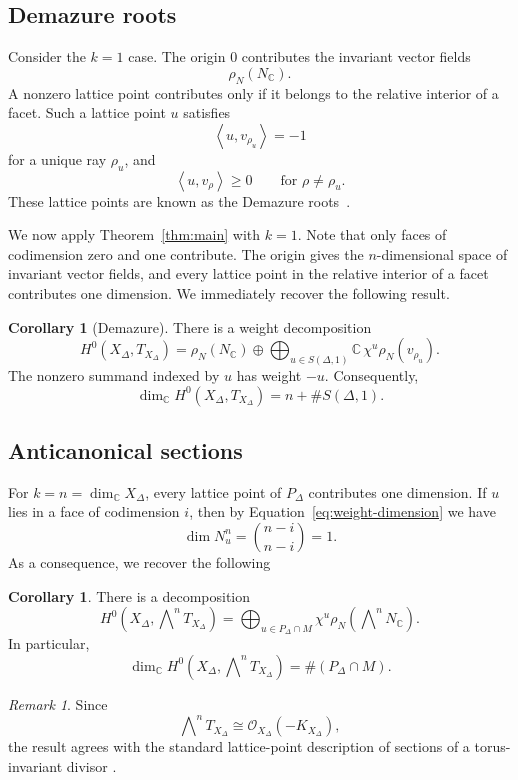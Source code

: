 \documentclass[colorlinks,11pt,reqno]{amsart}
\theoremstyle{definition}
\newtheorem{corollary}[theorem]{Corollary}
\theoremstyle{remark}
\newtheorem{remark}[theorem]{Remark}
\numberwithin{equation}{section}
\numberwithin{equation}{section}
\newcommand{\CC}{\mathbb{C}}
\newcommand{\Pair}[2]{\left\langle #1,#2\right\rangle}
\newcommand{\C}{\mathbb{C}}
\begin{document}
\subsection{Demazure roots}
Consider the \(k=1\) case. The origin $0$ contributes the invariant vector fields
\[
\rho_N(N_{\C}).
\]
A nonzero lattice point contributes only if it belongs to the relative interior of a facet. Such a lattice point \(u\) satisfies
\[
\Pair{u}{v_{\rho_u}}=-1
\]
for a unique ray \(\rho_u\), and
\[
\Pair{u}{v_\rho}\geq 0 \qquad \text{for }\rho\neq\rho_u.
\]
These lattice points are known as the Demazure roots~\cites{Cox, Demazure}.

We now apply Theorem~\ref{thm:main} with \(k=1\).
Note that only faces of codimension zero and one contribute. The origin gives the \(n\)-dimensional space of invariant vector fields, and every lattice point in the relative interior of a facet contributes one dimension.
We immediately recover the following result.
\begin{corollary}[Demazure]\label{cor:demazure}
There is a weight decomposition
\[
H^0(X_\Delta,T_{X_\Delta}) = \rho_N(N_{\CC}) \oplus \bigoplus_{u\in S(\Delta,1)}
\CC\, \chi^u\rho_N(v_{\rho_u}).
\]
The nonzero summand indexed by \(u\) has weight \(-u\).
Consequently,
\[
\dim_{\CC}H^0(X_\Delta,T_{X_\Delta}) = n+\#S(\Delta,1).
\]
\end{corollary}


\subsection{Anticanonical sections}
For \(k=n = \dim_\C X_{\Delta}\), every lattice point of \(P_\Delta\) contributes one dimension.
If \(u\) lies in a face of codimension \(i\), then by Equation~\eqref{eq:weight-dimension} we have
\[
\dim N_u^n = \binom{n-i}{n-i}=1.
\]
As a consequence, we recover the following
\begin{corollary}\label{cor:top-degree}
There is a decomposition
\[
H^0\!\left( X_\Delta,\bigwedge\nolimits^nT_{X_\Delta} \right) =
\bigoplus_{u\in P_\Delta\cap M} \chi^u\rho_N\!\left(\bigwedge\nolimits^nN_{\CC}\right).
\]
In particular,
\[
\dim_{\CC}H^0(X_\Delta,\bigwedge\nolimits^nT_{X_\Delta})=\#(P_\Delta\cap M).
\]
\end{corollary}
\begin{remark}
Since
\[
\bigwedge\nolimits^nT_{X_\Delta} \cong \mathcal{O}_{X_\Delta}(-K_{X_\Delta}),
\]
the result agrees with the standard lattice-point description of sections of a torus-invariant divisor
\cites{Cox, Fulton}.
\end{remark}
\end{document}
